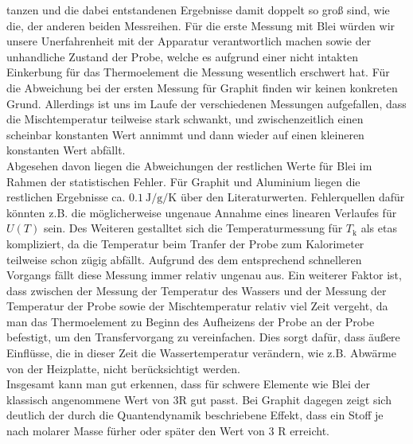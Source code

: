 \documentclass[
  bibliography=totoc,     %
  captions=tableheading,  %
  titlepage=firstiscover, %
]{scrartcl}
\begin{document}
tanzen und die dabei entstandenen Ergebnisse damit doppelt so groß sind, wie die, der
anderen beiden Messreihen. Für die erste Messung mit Blei würden wir unsere Unerfahrenheit
mit der Apparatur verantwortlich machen sowie der unhandliche Zustand der Probe, welche
es aufgrund einer nicht intakten Einkerbung für das Thermoelement die Messung wesentlich
erschwert hat. Für die Abweichung bei der ersten Messung für Graphit finden wir keinen konkreten Grund.
Allerdings ist uns im Laufe der verschiedenen Messungen aufgefallen, dass die Mischtemperatur teilweise
stark schwankt, und zwischenzeitlich einen scheinbar konstanten Wert annimmt und dann wieder auf
einen kleineren konstanten Wert abfällt.\\
Abgesehen davon liegen die Abweichungen der restlichen Werte für Blei im Rahmen der statistischen Fehler.
Für Graphit und Aluminium liegen die restlichen Ergebnisse ca. $\SI{0.1}{\joule\per\gram\per\kelvin}$ über den
Literaturwerten. Fehlerquellen dafür könnten z.B. die möglicherweise ungenaue Annahme eines
linearen Verlaufes für $U \left( T \right)$ sein.
Des Weiteren gestalltet sich die Temperaturmessung für $T_{\mathup{k}}$ als etas kompliziert,
da die Temperatur beim Tranfer der Probe zum Kalorimeter teilweise schon zügig abfällt.
Aufgrund des dem entsprechend schnelleren Vorgangs fällt diese Messung immer relativ ungenau aus.
Ein weiterer Faktor ist, dass zwischen der Messung der Temperatur des Wassers und der Messung
der Temperatur der Probe sowie der Mischtemperatur relativ viel Zeit vergeht, da man das
Thermoelement zu Beginn des Aufheizens der Probe an der Probe befestigt, um den Transfervorgang
zu vereinfachen. Dies sorgt dafür, dass äußere Einflüsse, die in dieser Zeit die Wassertemperatur
verändern, wie z.B. Abwärme von der Heizplatte, nicht berücksichtigt werden.\\
Insgesamt kann man gut erkennen, dass für schwere Elemente wie Blei der klassisch angenommene Wert
von 3R gut passt. Bei Graphit dagegen zeigt sich deutlich der durch die Quantendynamik beschriebene
Effekt, dass ein Stoff je nach molarer Masse fürher oder später den Wert von 3 R erreicht.
\clearpage
\nocite{*}
\printbibliography
\end{document}

